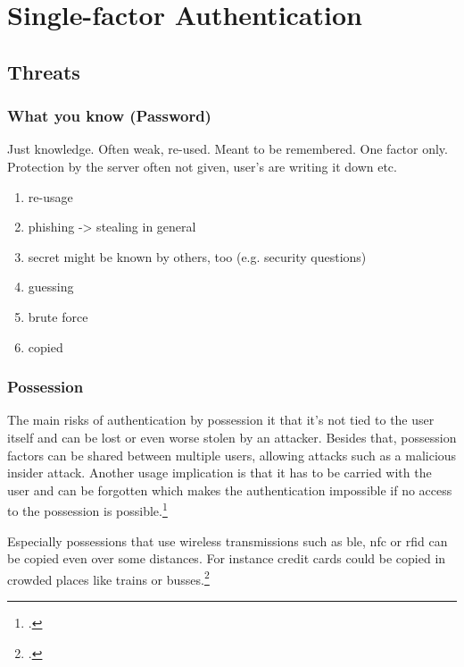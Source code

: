 \chapter{Single-factor Authentication}


\section{Threats}
\label{one-factor-threats}

\subsection{What you know (Password)}

Just knowledge. Often weak, re-used. Meant to be remembered. One factor only.\\
Protection by the server often not given, user's are writing it down etc.

\begin{enumerate}
	\item re-usage
	\item phishing -> stealing in general
	\item secret might be known by others, too (e.g. security questions)
	\item guessing
	\item brute force
	\item copied
\end{enumerate}

\subsection{Possession}

The main risks of authentication by possession it that it's not tied to the user itself and can be lost or even worse stolen by an attacker. Besides that, possession factors can be shared between multiple users, allowing attacks such as a malicious insider attack. Another usage implication is that it has to be carried with the user and can be forgotten which makes the authentication impossible if no access to the possession is possible.\footcites[See][263--264]{shostack2014threat}

Especially possessions that use wireless transmissions such as \gls{ble}, \gls{nfc} or \gls{rfid} can be copied even over some distances. For instance credit cards could be copied in crowded places like trains or busses.\footcite{6892730}

